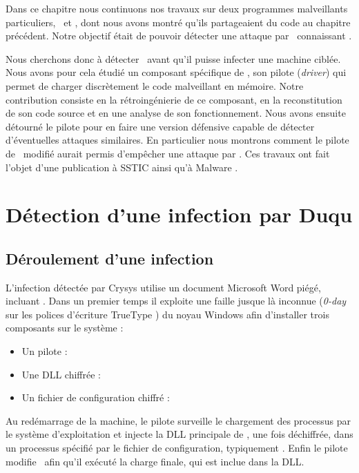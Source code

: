 Dans ce chapitre nous continuons nos travaux sur deux programmes malveillants particuliers, \duqu\ et \stux, dont nous avons montré qu'ils partageaient du code au chapitre précédent.
Notre objectif était de pouvoir détecter une attaque par \duqu\ connaissant \stux.

Nous cherchons donc à détecter \duqu\ avant qu'il puisse infecter une machine ciblée.
Nous avons pour cela étudié un composant spécifique de \duqu, son pilote (\emph{driver}) qui permet de charger discrètement le code malveillant en mémoire.
Notre contribution consiste en la rétroingénierie de ce composant, en la reconstitution de son code source et en une analyse de son fonctionnement.
Nous avons ensuite détourné le pilote pour en faire une version défensive capable de détecter d'éventuelles attaques similaires.
En particulier nous montrons comment le pilote de \duqu\ modifié aurait permis d'empêcher une attaque par \duqu.
Ces travaux ont fait l'objet d'une publication à SSTIC \cite{sstic13} ainsi qu'à  Malware \cite{mal13}.

\section{Détection d'une infection par Duqu}
\subsection{Déroulement d'une infection}
L'infection détectée par Crysys utilise un document Microsoft Word piégé, incluant \duqu.
Dans un premier temps il exploite une faille jusque là inconnue (\emph{0-day} sur les polices d'écriture TrueType \cite{CVETrueType}) du noyau Windows afin d'installer trois composants sur le système :
\begin{itemize}
 \item Un pilote : \driver
 \item Une DLL chiffrée : \netpDLL
 \item Un fichier de configuration chiffré : \netpCONF
\end{itemize}

Au redémarrage de la machine, le pilote surveille le chargement des processus par le système d'exploitation et injecte la DLL principale de \duqu, une fois déchiffrée, dans un processus spécifié par le fichier de configuration, typiquement \services.
Enfin le pilote modifie \services\ afin qu'il exécuté la charge finale, qui est inclue dans la DLL.

